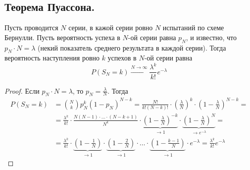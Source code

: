 \subsection{Теорема Пуассона.}
\begin{theorem}
    Пусть проводится $N$ серии, в кажой серии ровно $N$ испытаний по схеме Бернулли.
    Пусть вероятность успеха в $N$-ой серии равна $p_N$, и известно, что
    $p_N \cdot N = \lambda$ (некий показатель среднего результата в каждой серии).
    Тогда вероятность наступления ровно $k$ успехов в $N$-ой серии равна
    \[
        P(S_N = k) \xrightarrow{N \to \infty} \frac{\lambda^k}{k!}e^{-\lambda}
    \]
\end{theorem}
\begin{proof}
    Если $p_N \cdot N = \lambda$, то $p_N = \frac{\lambda}{N}$. Тогда
    \begin{align*}
        P(S_N = k) &= \binom{N}{k}p_N^{k}(1 - p_N)^{N - k} = \frac{N!}{k!(N - k)!} \cdot
        \left( \frac{\lambda}{N} \right)^k \cdot \left( 1 - \frac{\lambda}{N} \right)^{N - k} =\\
        &= \frac{\lambda^k}{k!} \cdot \frac{N(N - 1) \cdot \ldots \cdot (N - k + 1)}{N^k}
        \cdot \underbrace{\left( 1 - \frac{\lambda}{N} \right)^{-k}}_{\to 1}
        \cdot \underbrace{\left( 1 - \frac{\lambda}{N} \right)^N}_{\to e^{-\lambda}} =\\
        &= \frac{\lambda^k}{k!}
        \cdot \underbrace{\left( 1 - \frac{1}{N} \right)}_{\to 1}
        \cdot \underbrace{\left( 1 - \frac{2}{N} \right)}_{\to 1}
        \cdot \ldots
        \cdot \underbrace{\left( 1 - \frac{k - 1}{N} \right)}_{\to 1}
        \cdot e^{-\lambda}
        =\frac{\lambda^k}{k!} e^{-\lambda}
    \end{align*}
\end{proof}
